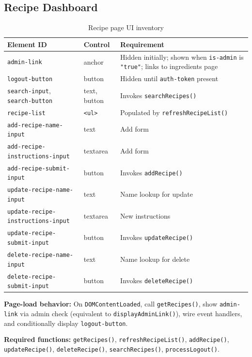 \documentclass{article}
\begin{document}
\subsection{Recipe Dashboard}
\begin{table}[htbp]
\centering
\footnotesize
\begin{tabular}{@{}llp{5.5cm}@{}}
\toprule
\textbf{Element ID} & \textbf{Control} & \textbf{Requirement} \\
\midrule
\texttt{admin-link} & anchor & Hidden initially; shown when \texttt{is-admin} is \texttt{"true"}; links to ingredients page \\
\texttt{logout-button} & button & Hidden until \texttt{auth-token} present \\
\texttt{search-input}, \texttt{search-button} & text, button & Invokes \texttt{searchRecipes()} \\
\texttt{recipe-list} & \texttt{<ul>} & Populated by \texttt{refreshRecipeList()} \\
\texttt{add-recipe-name-input} & text & Add form \\
\texttt{add-recipe-instructions-input} & textarea & Add form \\
\texttt{add-recipe-submit-input} & button & Invokes \texttt{addRecipe()} \\
\texttt{update-recipe-name-input} & text & Name lookup for update \\
\texttt{update-recipe-instructions-input} & textarea & New instructions \\
\texttt{update-recipe-submit-input} & button & Invokes \texttt{updateRecipe()} \\
\texttt{delete-recipe-name-input} & text & Name lookup for delete \\
\texttt{delete-recipe-submit-input} & button & Invokes \texttt{deleteRecipe()} \\
\bottomrule
\end{tabular}
\caption{Recipe page UI inventory}
\end{table}

\textbf{Page-load behavior:} On \texttt{DOMContentLoaded}, call \texttt{getRecipes()}, show \texttt{admin-link} via admin check (equivalent to \texttt{displayAdminLink()}), wire event handlers, and conditionally display \texttt{logout-button}.

\textbf{Required functions:} \texttt{getRecipes()}, \texttt{refreshRecipeList()}, \texttt{addRecipe()}, \texttt{updateRecipe()}, \texttt{deleteRecipe()}, \texttt{searchRecipes()}, \texttt{processLogout()}.
\end{document}
